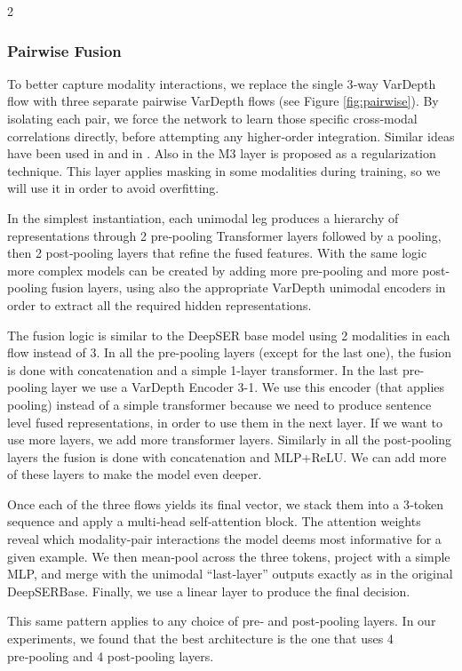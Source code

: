 \documentclass[10pt]{article}
\begin{document}
\begin{multicols}{2}
\subsubsection{Pairwise Fusion}
\par To better capture modality interactions, we replace the single 3‑way VarDepth flow with three separate pairwise VarDepth flows (see Figure \ref{fig:pairwise}). By isolating each pair, we force the network to learn those specific cross‑modal correlations directly, before attempting any higher‑order integration. Similar ideas have been used in \cite{m3} and in \cite{mulT}. Also in \cite{m3} the M3 layer is proposed as a regularization technique. This layer applies masking in some modalities during training, so we will use it in order to avoid overfitting. 
\par In the simplest instantiation, each unimodal leg produces a hierarchy of representations through 2 pre‑pooling Transformer layers followed by a pooling, then 2 post‑pooling layers that refine the fused features. With the same logic more complex models can be created by adding more pre-pooling and more post-pooling fusion layers, using also the appropriate VarDepth unimodal encoders in order to extract all the required hidden representations.  
\par The fusion logic is similar to the DeepSER base model using 2 modalities in each flow instead of 3. In all the pre-pooling layers (except for the last one), the fusion is done with concatenation and a simple 1-layer transformer. In the last pre-pooling layer we use a VarDepth Encoder 3-1. We use this encoder (that applies pooling)  instead of a simple transformer because we need to produce sentence level fused representations, in order to use them in the next layer. If we want to use more layers, we add more transformer layers. Similarly in all the post-pooling layers the fusion is done with concatenation and MLP+ReLU. We can add more of these layers to make the model even deeper.
\par Once each of the three flows yields its final vector, we stack them into a 3‑token sequence and apply a multi‑head self‑attention block. The attention weights reveal which modality‑pair interactions the model deems most informative for a given example. We then mean‑pool across the three tokens, project with a simple MLP, and merge with the unimodal “last‑layer” outputs exactly as in the original DeepSERBase. Finally, we use a linear layer to produce the final decision.
\par This same pattern applies to any choice of pre‑ and post‑pooling layers. In our experiments, we found that the best architecture is the one that uses 4 pre‑pooling and 4 post‑pooling layers.


\end{multicols}
\end{document}
